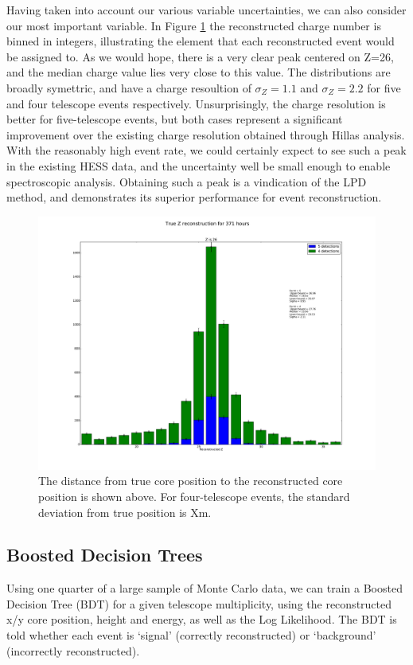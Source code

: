 \documentclass[11pt]{article}
\begin{document}
Having taken into account our various variable uncertainties, we can also consider our most important variable. In Figure \ref{fig:rawZ} the reconstructed charge number is binned in integers, illustrating the element that each reconstructed event would be assigned to. As we would hope, there is a very clear peak centered on Z=26, and the median charge value lies very close to this value. The distributions are broadly symettric, and have a charge resoultion of $\sigma_{Z} = 1.1$ and $\sigma_{Z} = 2.2$ for five and four telescope events respectively. Unsurprisingly, the charge resolution is better for five-telescope events, but both cases represent a significant improvement over the existing charge resolution obtained through Hillas analysis. With the reasonably high event rate, we could certainly expect to see such a peak in the existing HESS data, and the uncertainty well be small enough to enable spectroscopic analysis. Obtaining such a peak is a vindication of the LPD method, and demonstrates its superior performance for event reconstruction.

\begin{figure}
\begin{center}
\includegraphics[width=\textwidth]{rawZ}
\caption{The distance from true core position to the reconstructed core position is shown above. For four-telescope events, the standard deviation from true position is Xm.}
\label{fig:rawZ}
\end{center}
\end{figure} 

\subsection{Boosted Decision Trees}
Using one quarter of a large sample of Monte Carlo data, we can train a Boosted Decision Tree (BDT) for a given telescope multiplicity, using the reconstructed x/y core position, height and energy, as well as the Log Likelihood. The BDT is told whether each event is \textquoteleft signal' (correctly reconstructed) or \textquoteleft background' (incorrectly reconstructed). 
\end{document}
